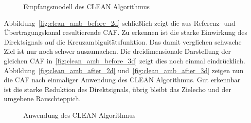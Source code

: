\begin{figure}[htb]
    \centering


    \caption{Empfangsmodell des CLEAN Algorithmus}\label{fig:clean_signal}
\end{figure}

Abbildung~\ref{fig:clean_amb_before_2d} schließlich zeigt die aus Referenz- und Übertragungskanal resultierende CAF\@. Zu erkennen ist die starke Einwirkung des Direktsignals auf die Kreuzambiguitätsfunktion. Das damit verglichen schwache Ziel ist nur noch schwer auszumachen. Die dreidimensionale Darstellung der gleichen CAF in~\ref{fig:clean_amb_before_3d} zeigt dies noch einmal eindrücklich. Abbildung~\ref{fig:clean_amb_after_2d} und~\ref{fig:clean_amb_after_3d} zeigen nun die CAF nach einmaliger Anwendung des CLEAN Algorithmus. Gut erkennbar ist die starke Reduktion des Direktsignals, übrig bleibt das Zielecho und der umgebene Rauschteppich.

\begin{figure}[htb]
    \centering


    \caption{Anwendung des CLEAN Algorithmus}\label{fig:clean_application}
\end{figure}

